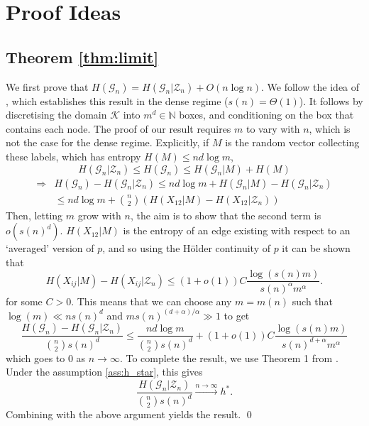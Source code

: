\documentclass[conference,letterpaper]{IEEEtran}
\newcommand{\tti}{\rightarrow\infty}
\newcommand{\graph}{\mathcal{G}}
\begin{document}
\section{Proof Ideas}
\label{sec:proofs}

\subsection{Theorem \ref{thm:limit}}
We first prove that $H(\graph_n) = H(\graph_n|\mathcal{Z}_n) + O(n\log n)$. We follow the idea of \cite[Theorem D.5]{janson2010graphons}, which establishes this result in the dense regime ($s(n) = \Theta(1)$). It follows by discretising the domain $\mathcal{K}$ into $m^d \in \mathbb{N}$ boxes, and conditioning on the box that contains each node. The proof of our result requires $m$ to vary with $n$, which is not the case for the dense regime. Explicitly, if $M$ is the random vector collecting these labels, which has entropy $H(M) \leq nd\log m$,
\begin{equation}
    H(\graph_n|\mathcal{Z}_n) \leq H(\graph_n) \leq H(\graph_n|M) + H(M)
\end{equation}
\begin{align}
    \Rightarrow &H(\graph_n)-H(\graph_n|\mathcal{Z}_n) \leq nd\log m + H(\graph_n|M) - H(\graph_n|\mathcal{Z}_n) \nonumber \\
    &\leq nd\log m + \binom{n}{2}(H(X_{12}|M) - H(X_{12}|\mathcal{Z}_n))
\end{align}
Then, letting $m$ grow with $n$, the aim is to show that the second term is $o(s(n)^d)$. $H(X_{12}|M)$ is the entropy of an edge existing with respect to an `averaged' version of $p$, and so using the H\"older continuity of $p$ it can be shown that\vspace{2cm}
\begin{equation}
    H(X_{ij}|M) - H(X_{ij}|\mathcal{Z}_n) \leq (1+o(1)) C\frac{\log (s(n)m)}{s(n)^{\alpha}m^\alpha}.
\end{equation}
for some $C > 0$. This means that we can choose any $m = m(n)$ such that $\log(m) \ll ns(n)^d$ and $m s(n)^{(d+\alpha)/\alpha}\gg 1$ to get
\begin{equation}
    \frac{H(\graph_n)-H(\graph_n|\mathcal{Z}_n)}{\binom{n}{2}s(n)^d} \leq \frac{nd\log m}{\binom{n}{2}s(n)^d}+(1+o(1)) C\frac{\log (s(n)m)}{s(n)^{d+\alpha}m^\alpha}
\end{equation}
which goes to 0 as $n\tti$. To complete the result, we use Theorem 1 from \cite{baker2026entropy}. Under the assumption \eqref{ass:h_star}, this gives
\begin{equation}
    \frac{H(\graph_n|\mathcal{Z}_n)}{\binom{n}{2}s(n)^d} \overset{n\tti}{\to} h^*.
\end{equation}
Combining with the above argument yields the result. \qed
\end{document}
